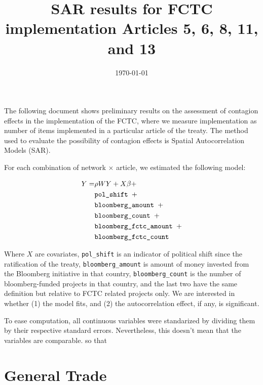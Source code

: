 \documentclass[10pt]{article}
\title{SAR results for FCTC implementation Articles 5, 6, 8, 11, and 13}
\date{\today}
\begin{document}
\maketitle
\tableofcontents

The following document shows preliminary results on the assessment of contagion
effects in the implementation of the FCTC, where we measure implementation as
number of items implemented in a particular article of the treaty. The method
used to evaluate the possibility of contagion effects is Spatial Autocorrelation
Models (SAR). 

For each combination of network $\times$ article, we estimated the following
model:

\begin{align}
Y = & \rho W Y + X\beta + \\
 & \mbox{\tt pol\_shift } + \\
 & \mbox{\tt bloomberg\_amount } + \\
 & \mbox{\tt bloomberg\_count } + \\
 & \mbox{\tt bloomberg\_fctc\_amount } + \\
 & \mbox{\tt bloomberg\_fctc\_count }
\end{align}

Where $X$ are covariates, \texttt{pol\_shift} is an indicator of political shift
since the ratification of the treaty, \texttt{bloomberg\_amount} is
amount of money invested from the Bloomberg initiative in that country, 
\texttt{bloomberg\_count} is the number of bloomberg-funded projects in that 
country, and the last two have the same definition but relative to FCTC related
projects only. We are interested in whether (1) the model fits,
and (2) the autocorrelation effect, if any, is significant.

To ease computation, all continuous variables were standarized by dividing them
by their respective standard errors. Nevertheless, this doesn't mean that the
variables are comparable.
so that 

\pagebreak

\clearpage\section{General Trade}






\end{document}
